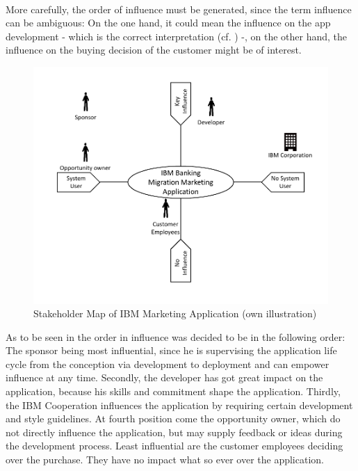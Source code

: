 \paragraph{} More carefully, the order of influence must be generated, since the term influence can be ambiguous: On the one hand, it could mean the influence on the app development - which is the correct interpretation (cf. ) -, on the other hand, the influence on the buying decision of the customer might be of interest.


\begin{figure}[H]
    \centering
    \includegraphics[height=.5\textheight]{img/smMarketingApp.pdf}
    \caption[Stakeholder Map of IBM Marketing Application]{Stakeholder Map of IBM Marketing Application (own illustration)}
    \label{fig:smIBM}
\end{figure}

As to be seen in  the order in influence was decided to be in the following order: The sponsor being most influential, since he is supervising the application life cycle from the conception via development to deployment and can empower influence at any time. Secondly, the developer has got great impact on the application, because his skills and commitment shape the application. Thirdly, the IBM Cooperation influences the application by requiring certain development and style guidelines. At fourth position come the opportunity owner, which do not directly influence the application, but may supply feedback or ideas during the development process. Least influential are the customer employees deciding over the purchase. They have no impact what so ever over the application. 

